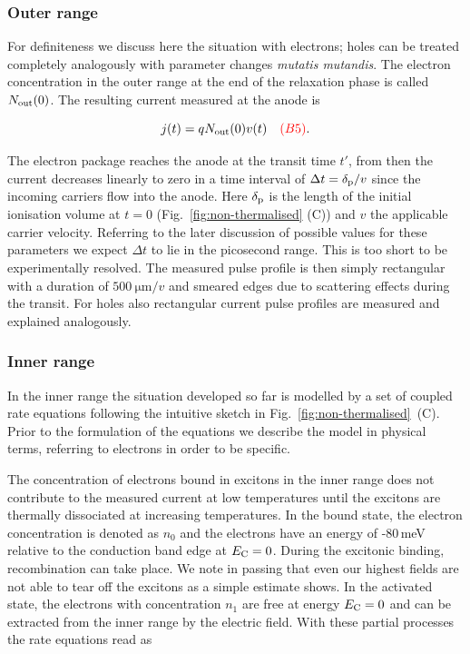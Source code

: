 \subsubsection{Outer range}

For definiteness we discuss here the situation with electrons; holes can be treated completely analogously with parameter changes \textit{mutatis mutandis}.
The electron concentration in the outer range at the end of the relaxation phase is called $N_{\textrm{out}}(0)$. 
The resulting current measured at the anode is

\begin{equation}
 j(t) = qN_{\textrm{out}}(0)v(t)\quad {\color{red}(B5)}. 
\end{equation}

\noindent
The electron package reaches the anode at the transit time $t'$, from then the current decreases linearly to zero in a time interval of  $\Delta t = \delta_{\textrm{p}}/v$  since the incoming carriers flow into the anode. 
Here $\delta_{\textrm{p}}$ is the length of the initial ionisation volume at $t = 0$ (Fig.~\ref{fig:non-thermalised} (C)) and $v$ the applicable carrier velocity. 
Referring to the later discussion of possible values for these parameters we expect $\Delta t$ to lie in the picosecond range. 
This is too short to be experimentally resolved. 
The measured pulse profile is then simply rectangular with a duration of $\SI{500}{\um/v}$ and smeared edges due to scattering effects during the transit. 
For holes also rectangular current pulse profiles are measured and explained analogously.

\subsubsection{Inner range}

In the inner range the situation developed so far is modelled by a set of coupled rate equations following the intuitive sketch in Fig.~\ref{fig:non-thermalised}~(C). 
Prior to the formulation of the equations we describe the model in physical terms, referring to electrons in order to be specific.

The concentration of electrons bound in excitons in the inner range does not contribute to the measured current at low temperatures until the excitons are thermally dissociated at increasing temperatures. 
In the bound state, the electron concentration is denoted as $n_0$ and the electrons have an energy of -80\,meV relative to the conduction band edge at $E_{\textrm{C}} = 0 $. 
During the excitonic binding, recombination can take place. 
We note in passing that even our highest fields are not able to tear off the excitons as a simple estimate shows. 
In the activated state, the electrons with concentration $n_1$ are free at energy $E_{\textrm{C}} = 0 $ and can be extracted from the inner range by the electric field.
With these partial processes the rate equations read as 


